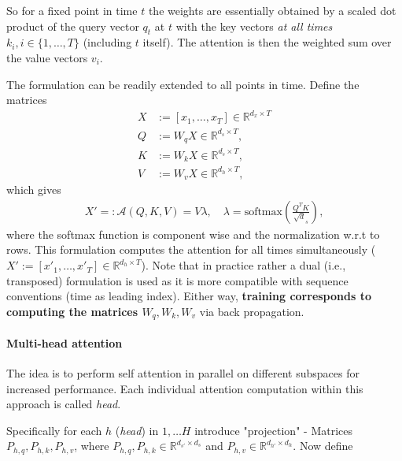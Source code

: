 \documentclass[12pt,a4paper]{article}
\begin{document}
So for a fixed point in time $t$ the weights are essentially obtained by a scaled dot product of the query vector $q_t$ at $t$ with the key vectors \textit{at all times}  $k_i, i \in \{1, \dots, T\}$ (including $t$ itself). The attention is then the weighted sum over the value vectors $v_i$. 

The formulation can be readily extended to all points in time. Define the matrices 
\begin{align}
X &:=[x_1,\dots, x_T] \in \mathbb{R}^{d_x\times T}\\
Q &:= W_q X \in \mathbb{R} ^ {d_s \times T}, \\ 
K &:= W_k X \in \mathbb{R} ^ {d_s \times T},\\ 
V &:= W_vX\in \mathbb{R} ^ {d_h \times T},
\end{align}
which gives
\begin{align}
	 X' =:\mathcal A (Q, K, V)  = V \lambda, \quad \lambda = \text{softmax}\left(\frac{Q^T K}{\sqrt d_s} \right),
\end{align}
where the softmax function is component wise and the normalization w.r.t to rows. This formulation computes the attention for all times simultaneously ($X':=[x'_1,\dots, x'_T]  \in \mathbb{R}^{d_h\times T}$). Note that in practice rather a dual (i.e., transposed) formulation is used as it is more compatible with sequence conventions (time as leading index).  Either way, \textbf{training corresponds to computing the matrices $W_q,W_k,W_v$} via back propagation.

\paragraph{Multi-head attention}
The idea is to perform self attention in parallel on different subspaces for increased performance. Each individual attention computation within this approach is called \textit{head}. 

Specifically for each  $h$ (\textit{head}) in $1, \dots H$ introduce "projection" - Matrices ${P_{h,q}, P_{h,k},  P_{h,v}}$, where $P_{h,q}, P_{h,k} \in \mathbb{R}^{d_{s'} \times d_s}$ and $P_{h,v} \in \mathbb{R}^{d_{h'} \times d_h}$. Now define
\end{document}
